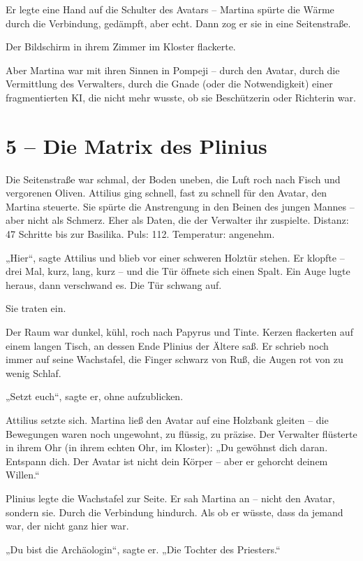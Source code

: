\documentclass[
]{article}
\begin{document}
Er legte eine Hand auf die Schulter des Avatars -- Martina spürte die Wärme durch die Verbindung, gedämpft, aber echt. Dann zog er sie in eine Seitenstraße.

Der Bildschirm in ihrem Zimmer im Kloster flackerte.

Aber Martina war mit ihren Sinnen in Pompeji -- durch den Avatar, durch die Vermittlung des Verwalters, durch die Gnade (oder die Notwendigkeit) einer fragmentierten KI, die nicht mehr wusste, ob sie Beschützerin oder Richterin war.

\section{5 -- Die Matrix des Plinius}\label{die-matrix-des-plinius}

Die Seitenstraße war schmal, der Boden uneben, die Luft roch nach Fisch und vergorenen Oliven. Attilius ging schnell, fast zu schnell für den Avatar, den Martina steuerte. Sie spürte die Anstrengung in den Beinen des jungen Mannes -- aber nicht als Schmerz. Eher als Daten, die der Verwalter ihr zuspielte. Distanz: 47 Schritte bis zur Basilika. Puls: 112. Temperatur: angenehm.

„Hier``, sagte Attilius und blieb vor einer schweren Holztür stehen. Er klopfte -- drei Mal, kurz, lang, kurz -- und die Tür öffnete sich einen Spalt. Ein Auge lugte heraus, dann verschwand es. Die Tür schwang auf.

Sie traten ein.

Der Raum war dunkel, kühl, roch nach Papyrus und Tinte. Kerzen flackerten auf einem langen Tisch, an dessen Ende Plinius der Ältere saß. Er schrieb noch immer auf seine Wachstafel, die Finger schwarz von Ruß, die Augen rot von zu wenig Schlaf.

„Setzt euch``, sagte er, ohne aufzublicken.

Attilius setzte sich. Martina ließ den Avatar auf eine Holzbank gleiten -- die Bewegungen waren noch ungewohnt, zu flüssig, zu präzise. Der Verwalter flüsterte in ihrem Ohr (in ihrem echten Ohr, im Kloster): „Du gewöhnst dich daran. Entspann dich. Der Avatar ist nicht dein Körper -- aber er gehorcht deinem Willen.``

Plinius legte die Wachstafel zur Seite. Er sah Martina an -- nicht den Avatar, sondern sie. Durch die Verbindung hindurch. Als ob er wüsste, dass da jemand war, der nicht ganz hier war.

„Du bist die Archäologin``, sagte er. „Die Tochter des Priesters.``
\end{document}
